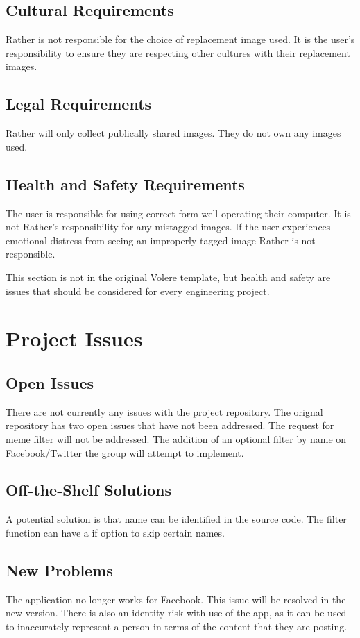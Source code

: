 \documentclass[12pt, titlepage]{article}
\begin{document}
\subsection{Cultural Requirements}
Rather is not responsible for the choice of replacement image used. It is the user's responsibility to ensure they are respecting other cultures with their replacement images.

\subsection{Legal Requirements}
Rather will only collect publically shared images. They do not own any images used. 

\subsection{Health and Safety Requirements}
The user is responsible for using correct form well operating their computer. It is not Rather's responsibility for any mistagged images. If the user experiences emotional distress from seeing an improperly tagged image Rather is not responsible. 

This section is not in the original Volere template, but health and safety are
issues that should be considered for every engineering project.

\section{Project Issues}

\subsection{Open Issues}
There are not currently any issues with the project repository. The orignal repository has two open issues that have not been addressed. The request for meme filter will not be addressed. The addition of an optional filter by name on Facebook/Twitter the group will attempt to implement. 

\subsection{Off-the-Shelf Solutions}
A potential solution is that name can be identified in the source code. The filter function can have a if option to skip certain names.

\subsection{New Problems}
The application no longer works for Facebook. This issue will be resolved in the new version. There is also an identity risk with use of the app, as it can be used to inaccurately represent a person in terms of the content that they are posting.
\end{document}
